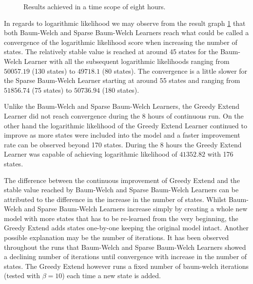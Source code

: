 \begin{figure}
	\centering
	\caption{Results achieved in a time scope of eight hours.}
	\label{fig:eight_hour_run}
\end{figure}

In regards to logarithmic likelihood we may observe from the result graph \ref{fig:eight_hour_run} that both Baum-Welch and Sparse Baum-Welch Learners reach what could be called a convergence of the logarithmic likelihood score when increasing the number of states. The relatively stable value is reached at around 45 states for the Baum-Welch Learner with all the subsequent logarithmic likelihoods ranging from $50057.19$ (130 states) to $49718.1$ (80 states). The convergence is a little slower for the Sparse Baum-Welch Learner starting at around 55 states and ranging from $51856.74$ (75 states) to $50736.94$ (180 states).

Unlike the Baum-Welch and Sparse Baum-Welch Learners, the Greedy Extend Learner did not reach convergence during the 8 hours of continuous run. On the other hand the logarithmic likelihood of the Greedy Extend Learner continued to improve as more states were included into the model and a faster improvement rate can be observed beyond 170 states. During the 8 hours the Greedy Extend Learner was capable of achieving logarithmic likelihood of $41352.82$ with 176 states.

The difference between the continuous improvement of Greedy Extend and the stable value reached by Baum-Welch and Sparse Baum-Welch Learners can be attributed to the difference in the increase in the number of states. Whilst Baum-Welch and Sparse Baum-Welch Learners increase simply by creating a whole new model with more states that has to be re-learned from the very beginning, the Greedy Extend adds states one-by-one keeping the original model intact. Another possible explanation may be the number of iterations. It has been observed throughout the runs that Baum-Welch and Sparse Baum-Welch Learners showed a declining number of iterations until convergence with increase in the number of states. The Greedy Extend however runs a fixed number of \gls{baum-welch} iterations (tested with $\beta = 10$) each time a new state is added.

